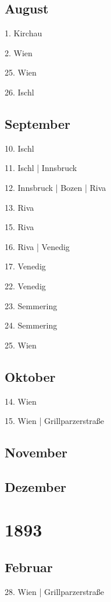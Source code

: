 \documentclass[twoside=false,titlepage=false,open=any, parskip=never, fontsize=10pt, headings=small, chapterprefix=false, appendixprefix=false, DIV=15]{scrbook}
\begin{document}
\begin{multicols}{3}
            \section*{August}
            1. Kirchau\par
            2. Wien\par
            25. Wien\par
            26. Ischl\par
            \section*{September}
            10. Ischl\par
            11. Ischl | Innsbruck\par
            12. Innsbruck | Bozen | Riva\par
            13. Riva\par
            15. Riva\par
            16. Riva | Venedig\par
            17. Venedig\par
            22. Venedig\par
            23. Semmering\par
            24. Semmering\par
            25. Wien\par
            \section*{Oktober}
            14. Wien\par
            15. Wien | Grillparzerstraße\par
            \section*{November}
            \section*{Dezember}
            \chapter*{1893}
            \section*{Februar}
            28. Wien | Grillparzerstraße\par

\end{multicols}
\end{document}
